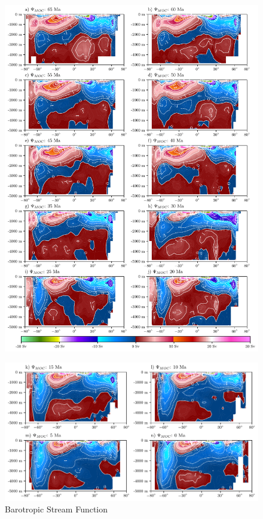 \documentclass[a4paper]{article}
\begin{document}
\begin{multicols}{2}



\end{multicols}
\begin{figure}[H]

\includegraphics[width=1\linewidth]{MOC_1.pdf}
\end{figure}
\begin{figure}[H]
\includegraphics[width=1\linewidth]{MOC_2.pdf}
\caption{Barotropic Stream Function}
\label{fig:bsf_total}
\end{figure}
\end{document}
